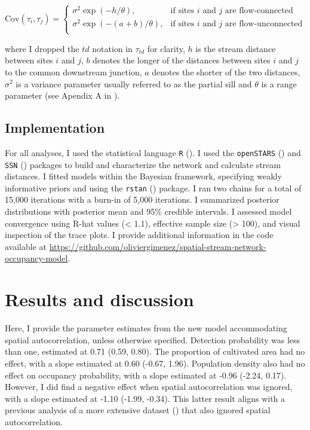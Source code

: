 \documentclass[
  11pt,
  a4paper,
]{article}
\begin{document}
\[
    \text{Cov}(\tau_{i},\tau_{j})=
\begin{cases}
    \displaystyle{\sigma^2\exp(-h/\theta)},& \text{if sites } i \text{ and } j \text{ are flow-connected }\\
    \displaystyle{\sigma^2\exp(-(a+b)/\theta)},& \text{if sites } i \text{ and } j \text{ are flow-unconnected }\\
\end{cases}
\]

where I dropped the \(td\) notation in \(\tau_{td}\) for clarity, \(h\) is the stream distance between sites \(i\) and \(j\), \(b\) denotes the longer of the distances between sites \(i\) and \(j\) to the common downstream junction, \(a\) denotes the shorter of the two distances, \(\sigma^2\) is a variance parameter usually referred to as the partial sill and \(\theta\) is a range parameter (see Apendix A in ).

\subsection{Implementation}\label{implementation}

For all analyses, I used the statistical language \texttt{R} (). I used the \texttt{openSTARS} () and \texttt{SSN} () packages to build and characterize the network and calculate stream distances. I fitted models within the Bayesian framework, specifying weakly informative priors and using the \texttt{rstan} () package. I ran two chains for a total of 15,000 iterations with a burn-in of 5,000 iterations. I summarized posterior distributions with posterior mean and 95\% credible intervals. I assessed model convergence using R-hat values (\textless{} 1.1), effective sample size (\textgreater{} 100), and visual inspection of the trace plots. I provide additional information in the code available at \url{https://github.com/oliviergimenez/spatial-stream-network-occupancy-model}.

\section{Results and discussion}\label{results-and-discussion}

Here, I provide the parameter estimates from the new model accommodating spatial autocorrelation, unless otherwise specified. Detection probability was less than one, estimated at 0.71 (0.59, 0.80). The proportion of cultivated area had no effect, with a slope estimated at 0.60 (-0.67, 1.96). Population density also had no effect on occupancy probability, with a slope estimated at -0.96 (-2.24, 0.17). However, I did find a negative effect when spatial autocorrelation was ignored, with a slope estimated at -1.10 (-1.99, -0.34). This latter result aligns with a previous analysis of a more extensive dataset () that also ignored spatial autocorrelation.
\end{document}
